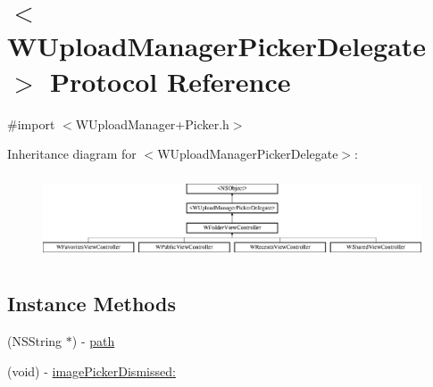 \hypertarget{protocol_w_upload_manager_picker_delegate-p}{\section{$<$W\-Upload\-Manager\-Picker\-Delegate$>$ Protocol Reference}
\label{protocol_w_upload_manager_picker_delegate-p}
}


{\ttfamily \#import $<$W\-Upload\-Manager+\-Picker.\-h$>$}

Inheritance diagram for $<$W\-Upload\-Manager\-Picker\-Delegate$>$\-:\begin{figure}[H]
\begin{center}
\leavevmode
\includegraphics[height=2.533937cm]{protocol_w_upload_manager_picker_delegate-p}
\end{center}
\end{figure}
\subsection*{Instance Methods}
\begin{DoxyCompactItemize}
\item 
(N\-S\-String $\ast$) -\/ \hyperlink{protocol_w_upload_manager_picker_delegate-p_a9202055fdb4b2a43f66e2f5d0af2c260}{path}
\item 
(void) -\/ \hyperlink{protocol_w_upload_manager_picker_delegate-p_a1180d7d51ab074cbc79aa10f2dd9ab14}{image\-Picker\-Dismissed\-:}
\end{DoxyCompactItemize}


